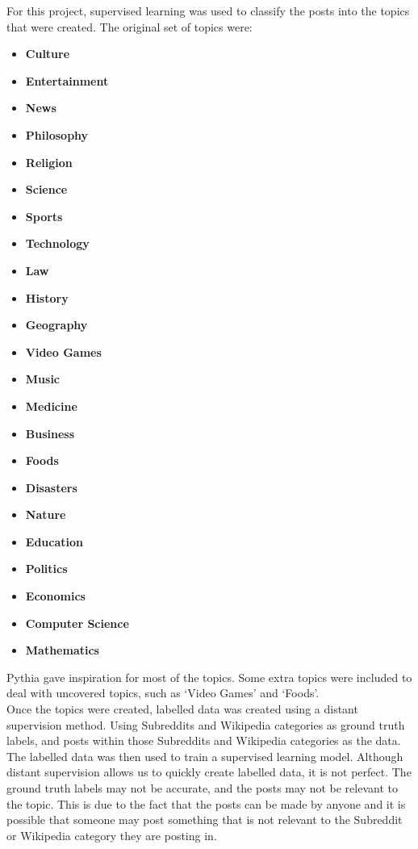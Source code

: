 For this project, supervised learning was used to classify the posts into the topics that were created. The original set of topics were:
\begin{multicols}{2}
\begin{itemize}
    \item \textbf{Culture}
    \item \textbf{Entertainment}
    \item \textbf{News}
    \item \textbf{Philosophy}
    \item \textbf{Religion}
    \item \textbf{Science}
    \item \textbf{Sports}
    \item \textbf{Technology}
    \item \textbf{Law}
    \item \textbf{History}
    \item \textbf{Geography}
    \item \textbf{Video Games}
    \item \textbf{Music}
    \item \textbf{Medicine}
    \item \textbf{Business}
    \item \textbf{Foods}
    \item \textbf{Disasters}
    \item \textbf{Nature}
    \item \textbf{Education}
    \item \textbf{Politics}
    \item \textbf{Economics}
    \item \textbf{Computer Science}
    \item \textbf{Mathematics}
\end{itemize}
\end{multicols}

Pythia \cite{Pythia} gave inspiration for most of the topics. Some extra topics were included to deal with uncovered topics, such as
`Video Games' and `Foods'.\\

Once the topics were created, labelled data was created using a distant supervision method. Using Subreddits and Wikipedia categories
as ground truth labels, and posts within those Subreddits and Wikipedia categories as the data. The labelled data was then used 
to train a supervised learning model. Although distant supervision allows us to quickly create labelled data, it is not perfect. 
The ground truth labels may not be accurate, and the posts may not be relevant to the topic. This is due to the fact that the posts
can be made by anyone and it is possible that someone may post something that is not relevant to the Subreddit or Wikipedia category they
are posting in.
